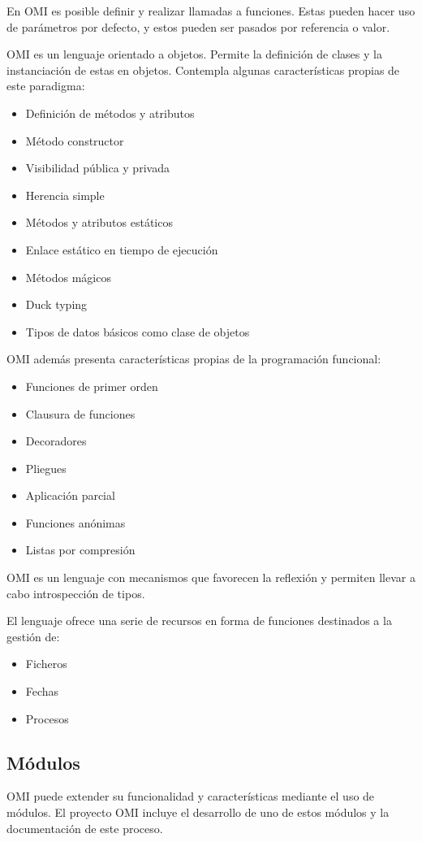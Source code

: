 En OMI es posible definir y realizar llamadas a funciones. Estas pueden hacer uso de parámetros por defecto, y estos pueden 
ser pasados por referencia o valor.

OMI es un lenguaje orientado a objetos. Permite la definición de clases y la instanciación de estas en objetos. Contempla algunas características 
propias de este paradigma:

\begin{itemize}
\item Definición de métodos y atributos
\item Método constructor
\item Visibilidad pública y privada
\item Herencia simple
\item Métodos y atributos estáticos
\item Enlace estático en tiempo de ejecución
\item Métodos mágicos
\item Duck typing
\item Tipos de datos básicos como clase de objetos
\end{itemize}

OMI además presenta características propias de la programación funcional:

\begin{itemize}
\item Funciones de primer orden
\item Clausura de funciones
\item Decoradores
\item Pliegues
\item Aplicación parcial
\item Funciones anónimas
\item Listas por compresión
\end{itemize}

OMI es un lenguaje con mecanismos que favorecen la reflexión y permiten llevar a cabo introspección de tipos. 

El lenguaje ofrece una serie de recursos en forma de funciones destinados a la gestión de:

\begin{itemize}
  \item Ficheros
  \item Fechas
  \item Procesos
\end{itemize}
  
\subsection{Módulos}
OMI puede extender su funcionalidad y características mediante el uso de módulos. El proyecto OMI incluye 
el desarrollo de uno de estos módulos y la documentación de este proceso.

